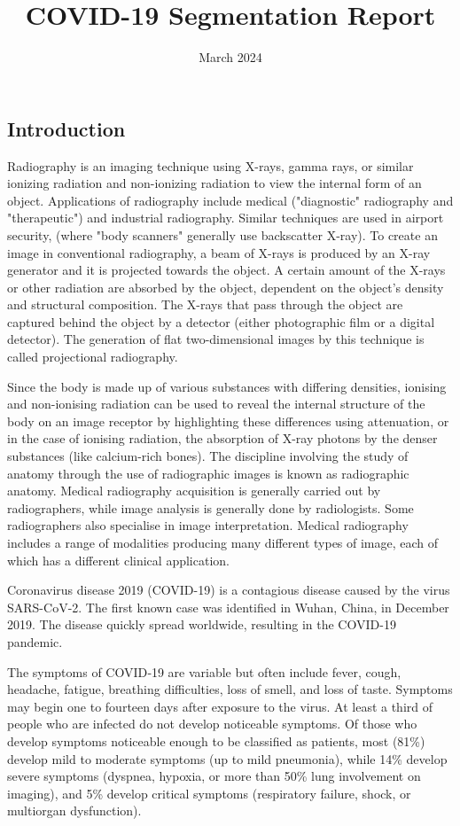 \documentclass{article}
\title{COVID-19 Segmentation Report}
\date{March 2024}
\begin{document}
\maketitle
\begin{multicols}{2}
\section{Introduction}
Radiography is an imaging technique using X-rays, gamma rays, or similar ionizing radiation and non-ionizing radiation to view the internal form of an object. Applications of radiography include medical ("diagnostic" radiography and "therapeutic") and industrial radiography. Similar techniques are used in airport security, (where "body scanners" generally use backscatter X-ray). To create an image in conventional radiography, a beam of X-rays is produced by an X-ray generator and it is projected towards the object. A certain amount of the X-rays or other radiation are absorbed by the object, dependent on the object's density and structural composition. The X-rays that pass through the object are captured behind the object by a detector (either photographic film or a digital detector). The generation of flat two-dimensional images by this technique is called projectional radiography.

Since the body is made up of various substances with differing densities, ionising and non-ionising radiation can be used to reveal the internal structure of the body on an image receptor by highlighting these differences using attenuation, or in the case of ionising radiation, the absorption of X-ray photons by the denser substances (like calcium-rich bones). The discipline involving the study of anatomy through the use of radiographic images is known as radiographic anatomy. Medical radiography acquisition is generally carried out by radiographers, while image analysis is generally done by radiologists. Some radiographers also specialise in image interpretation. Medical radiography includes a range of modalities producing many different types of image, each of which has a different clinical application.

Coronavirus disease 2019 (COVID-19) is a contagious disease caused by the virus SARS-CoV-2. The first known case was identified in Wuhan, China, in December 2019. The disease quickly spread worldwide, resulting in the COVID-19 pandemic.

The symptoms of COVID‑19 are variable but often include fever, cough, headache, fatigue, breathing difficulties, loss of smell, and loss of taste. Symptoms may begin one to fourteen days after exposure to the virus. At least a third of people who are infected do not develop noticeable symptoms. Of those who develop symptoms noticeable enough to be classified as patients, most (81\%) develop mild to moderate symptoms (up to mild pneumonia), while 14\% develop severe symptoms (dyspnea, hypoxia, or more than 50\% lung involvement on imaging), and 5\% develop critical symptoms (respiratory failure, shock, or multiorgan dysfunction).


\end{multicols}
\end{document}
